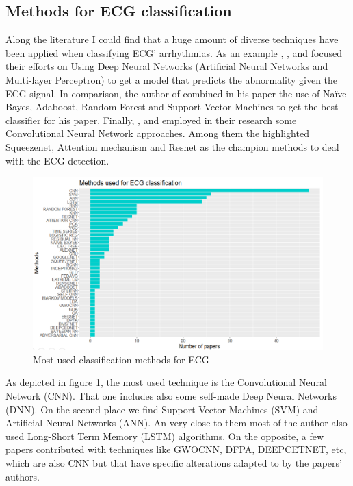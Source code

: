\subsection{Methods for ECG classification} \label{methods_ECG_class}

Along the literature I could find that a huge amount of diverse techniques have been applied when classifying ECG' arrhythmias. As an example \cite{ecg_methods1}, \cite{ecg_methods2}, and \cite{ecg_methods3} focused their efforts on Using Deep Neural Networks (Artificial Neural Networks and Multi-layer Perceptron) to get a model that predicts the abnormality given the ECG signal. In comparison, the author of \cite{ecg_methods4} combined in his paper the use of Naïve Bayes, Adaboost, Random Forest and Support Vector Machines to get the best classifier for his paper. Finally, \cite{ecg_methods5}, \cite{ecg_methods6} and \cite{ecg_methods7} employed in their research some Convolutional Neural Network approaches. Among them the highlighted Squeezenet, Attention mechanism and Resnet as the champion methods to deal with the ECG detection.

 \begin{figure}[H]
\centering
\includegraphics[scale=0.48]{img/classif_methods.PNG}
\caption{Most used classification methods for ECG}
\label{fig:classif_methods}
\end{figure}

As depicted in figure \ref{fig:classif_methods}, the most used technique is the Convolutional Neural Network (CNN). That one includes also some self-made Deep Neural Networks (DNN). On the second place we find Support Vector Machines (SVM) and Artificial Neural Networks (ANN). An very close to them most of the author also used Long-Short Term Memory (LSTM) algorithms. On the opposite, a few papers contributed with techniques like GWOCNN, DFPA, DEEPCETNET, etc, which are also CNN but that have specific alterations adapted to by the papers' authors.

